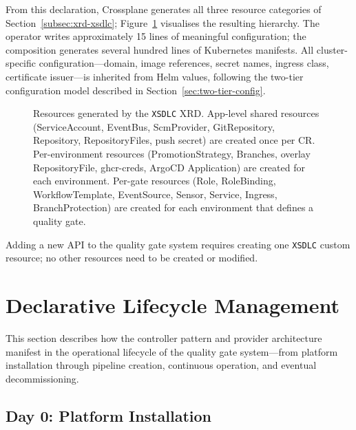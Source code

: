 From this declaration, Crossplane generates all three resource categories of Section~\ref{subsec:xrd-xsdlc}; Figure~\ref{fig:xrd-resource-hierarchy} visualises the resulting hierarchy. The operator writes approximately 15 lines of meaningful configuration; the composition generates several hundred lines of Kubernetes manifests. All cluster-specific configuration---domain, image references, secret names, ingress class, certificate issuer---is inherited from Helm values, following the two-tier configuration model described in Section~\ref{sec:two-tier-config}.

\begin{figure}[htbp]
\centering
\resizebox{\textwidth}{!}{%
%
}
\caption{Resources generated by the \texttt{XSDLC} XRD. App-level shared resources (ServiceAccount, EventBus, ScmProvider, GitRepository, Repository, RepositoryFiles, push secret) are created once per CR. Per-environment resources (PromotionStrategy, Branches, overlay RepositoryFile, ghcr-creds, ArgoCD Application) are created for each environment. Per-gate resources (Role, RoleBinding, WorkflowTemplate, EventSource, Sensor, Service, Ingress, BranchProtection) are created for each environment that defines a quality gate.}
\label{fig:xrd-resource-hierarchy}
\end{figure}

Adding a new API to the quality gate system requires creating one \texttt{XSDLC} custom resource; no other resources need to be created or modified.

\section{Declarative Lifecycle Management}
\label{sec:lifecycle-management}

This section describes how the controller pattern and provider architecture manifest in the operational lifecycle of the quality gate system---from platform installation through pipeline creation, continuous operation, and eventual decommissioning.

\subsection{Day 0: Platform Installation}
\label{subsec:day0}

